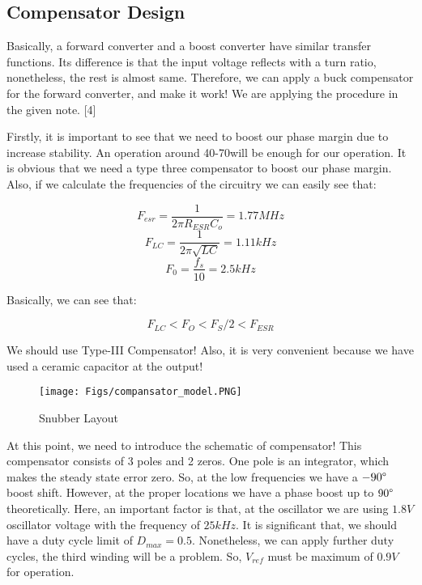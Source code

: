 \subsection{Compensator Design}

Basically, a forward converter and a boost converter have similar transfer functions. Its difference is that the input voltage reflects with a turn ratio, nonetheless, the rest is almost same. Therefore, we can apply a buck compensator for the forward converter, and make it work! We are applying the procedure in the given note. [4]

Firstly, it is important to see that we need to boost our phase margin due to increase stability. An operation around 40-70\degree will be enough for our operation. It is obvious that we need a type three compensator to boost our phase margin. Also, if we calculate the frequencies of the circuitry we can easily see that:

\begin{equation}
    F_{esr} = \dfrac{1}{2 \pi R_{ESR} C_o} = 1.77 MHz
\end{equation}
\begin{equation}
    F_{LC} = \dfrac{1}{2 \pi \sqrt{LC}} = 1.11 kHz
\end{equation}
\begin{equation}
    F_{0} = \dfrac{f_s}{10} = 2.5 kHz
\end{equation}

Basically, we can see that:

\begin{equation}
    F_{LC} < F_{O} < F_S/2 < F_{ESR}
\end{equation}

We should use Type-III Compensator! Also, it is very convenient because we have used a ceramic capacitor at the output!

\begin{wrapfigure}{r}{0.5\textwidth}
  \vspace{-20pt}
  \begin{center}
    \texttt{[image: Figs/compansator\_model.PNG]}
  \end{center}
  \vspace{-20pt}
  \caption{Snubber Layout}
  \label{Snubberlayout}
  \vspace{-10pt}
\end{wrapfigure}

At this point, we need to introduce the schematic of compensator! This compensator consists of 3 poles and 2 zeros. One pole is an integrator, which makes the steady state error zero. So, at the low frequencies we have a $-90 \degree$ boost shift. However, at the proper locations we have a phase boost up to $90 \degree$ theoretically. Here, an important factor is that, at the oscillator we are using $1.8V$ oscillator voltage with the frequency of $25kHz$. It is significant that, we should have a duty cycle limit of $D_{max} = 0.5$. Nonetheless, we can apply further duty cycles, the third winding will be a problem. So, $V_{ref}$ must be maximum of $0.9V$ for operation.


